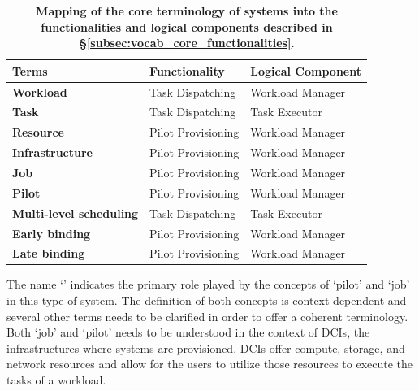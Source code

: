 \documentclass{sig-alternate}
\begin{document}
\begin{table}
 \centering
 \begin{tabular}{|l|l|l|}
  \hline
    \textbf{Terms} & \textbf{Functionality} & \textbf{Logical Component} \\ 
  \hline
  \hline
    \textbf{Workload} & Task Dispatching & Workload Manager \\
  \hline
    \textbf{Task} & Task Dispatching & Task Executor \\
  \hline
    \textbf{Resource} & Pilot Provisioning & Workload Manager \\
  \hline
    \textbf{Infrastructure} & Pilot Provisioning & Workload Manager \\
  \hline
    \textbf{Job} & Pilot Provisioning & Workload Manager \\
  \hline
    \textbf{Pilot} & Pilot Provisioning & Workload Manager \\
  \hline
    \textbf{Multi-level scheduling} & Task Dispatching & Task Executor \\
  \hline
    \textbf{Early binding} & Pilot Provisioning & Workload Manager \\
  \hline
    \textbf{Late binding} & Pilot Provisioning & Workload Manager \\
  \hline
 \end{tabular}
 \caption{\textbf{Mapping of the core terminology of \pilot systems into 
  the functionalities and logical components described in 
  \S\ref{subsec:vocab_core_functionalities}.}\up}
 \label{table:terminology}
\end{table}

The name `\pilotjob' indicates the primary role played by the concepts of
`pilot' and `job' in this type of system. The definition of both concepts is
context-dependent and several other terms needs to be clarified in order to
offer a coherent terminology. Both `job' and `pilot' needs to be understood in
the context of DCIs, the infrastructures where \pilotjobs systems are
provisioned. DCIs offer compute, storage, and network resources and
\pilotjobs allow for the users to utilize those resources to execute the tasks
of a workload.
\end{document}
